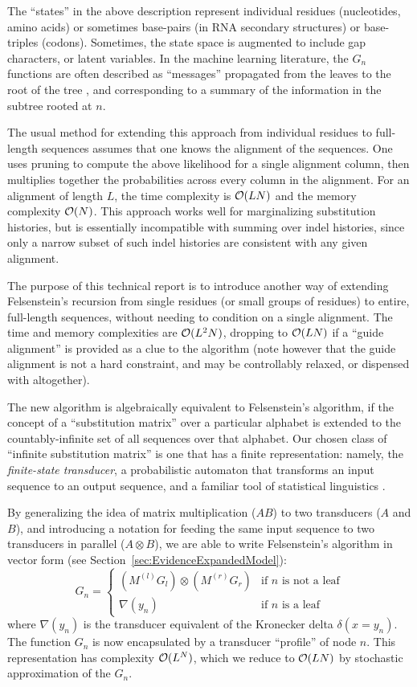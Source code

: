 \documentclass{article}
\newcommand\fork{\otimes}
\newcommand\recognize{\nabla}
\begin{document}
The ``states'' in the above description represent individual residues (nucleotides, amino acids) or sometimes base-pairs (in RNA secondary structures) or base-triples (codons).
Sometimes, the state space is augmented to include gap characters, or latent variables.
In the machine learning literature, the $G_n$ functions are often described as ``messages'' propagated from the leaves to the root of the tree \cite{KschischangEtAl98},
and corresponding to a summary of the information in the subtree rooted at $n$.

The usual method for extending this approach from individual residues to full-length sequences assumes that one knows the alignment of the sequences.
One uses pruning to compute the above likelihood for a single alignment column,
then multiplies together the probabilities across every column in the alignment.
For an alignment of length $L$, the time complexity is ${\cal O}(LN)$ and the memory complexity ${\cal O}(N)$.
This approach works well for marginalizing substitution histories, but is essentially incompatible with summing over indel histories,
since only a narrow subset of such indel histories are consistent with any given alignment.

The purpose of this technical report is to introduce another way of extending Felsenstein's recursion from single residues (or small groups of residues)
to entire, full-length sequences, without needing to condition on a single alignment.
The time and memory complexities are ${\cal O}(L^2N)$, dropping to ${\cal O}(LN)$ if a ``guide alignment'' is provided as a clue to the algorithm
(note however that the guide alignment is not a hard constraint, and may be controllably relaxed, or dispensed with altogether).

The new algorithm is algebraically equivalent to Felsenstein's algorithm,
if the concept of a ``substitution matrix'' over a particular alphabet is extended to the countably-infinite set of all sequences over that alphabet.
Our chosen class of ``infinite substitution matrix'' is one that has a finite representation:
namely, the {\em finite-state transducer}, a probabilistic automaton that transforms an input sequence to an output sequence,
and a familiar tool of statistical linguistics \cite{MohriPereiraRiley2000}.

By generalizing the idea of matrix multiplication ($AB$) to two transducers ($A$ and $B$),
and introducing a notation for feeding the same input sequence to two transducers in parallel ($A \fork B$),
we are able to write Felsenstein's algorithm in vector form (see Section~\ref{sec:EvidenceExpandedModel}):
\[
G_n = \left\{
\begin{array}{ll}
\left( M^{(l)} G_l \right) \fork \left( M^{(r)} G_r \right) & \mbox{if $n$ is not a leaf} \\
\recognize(y_n) & \mbox{if $n$ is a leaf}
\end{array}
\right.
\]
where $\recognize(y_n)$ is the transducer equivalent of the Kronecker delta $\delta(x=y_n)$.
The function $G_n$ is now encapsulated by a transducer ``profile'' of node $n$.
This representation has complexity ${\cal O}(L^N)$, which we reduce to ${\cal O}(LN)$ by stochastic approximation of the $G_n$.
\end{document}
